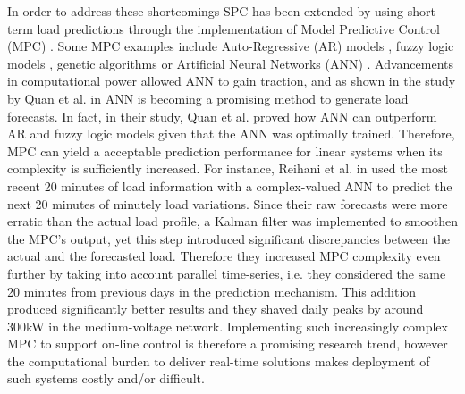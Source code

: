 In order to address these shortcomings SPC has been extended by using short-term load predictions through the implementation of Model Predictive Control (MPC) \cite{Gybel2012, Hatziargyriou2015}.
Some MPC examples include Auto-Regressive (AR) models \cite{Li2009, Nie2011}, fuzzy logic models \cite{Sannomiya2001, Chen2013a}, genetic algorithms \cite{Xia2015a, Liu2015} or Artificial Neural Networks (ANN) \cite{Kalogirou2014, Quan2014, Lee2014, Pezeshki2014, Vaz2016, Reihani2016, Xiao2017}.
Advancements in computational power allowed ANN to gain traction, and as shown in the study by Quan et al. in \cite{Quan2014} ANN is becoming a promising method to generate load forecasts.
In fact, in their study, Quan et al. proved how ANN can outperform AR and fuzzy logic models given that the ANN was optimally trained.
Therefore, MPC can yield a acceptable prediction performance for linear systems when its complexity is sufficiently increased.
For instance, Reihani et al. in \cite{Reihani2016} used the most recent 20 minutes of load information with a complex-valued ANN to predict the next 20 minutes of minutely load variations.
Since their raw forecasts were more erratic than the actual load profile, a Kalman filter was implemented to smoothen the MPC's output, yet this step introduced significant discrepancies between the actual and the forecasted load.
Therefore they increased MPC complexity even further by taking into account parallel time-series, i.e. they considered the same 20 minutes from previous days in the prediction mechanism.
This addition produced significantly better results and they shaved daily peaks by around 300kW in the medium-voltage network.
Implementing such increasingly complex MPC to support on-line control is therefore a promising research trend, however the computational burden to deliver real-time solutions makes deployment of such systems costly and/or difficult.

